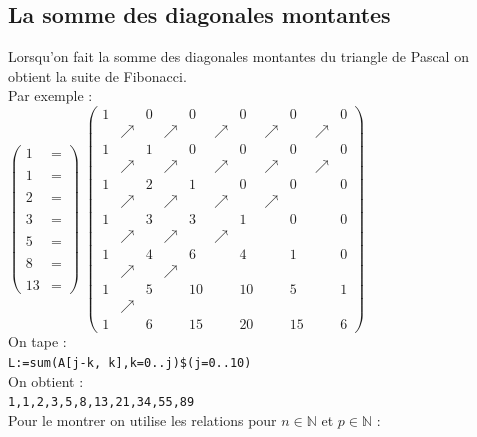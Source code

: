 \documentclass[a4paper,11pt]{book}
\newcommand{\N}{{\mathbb{N}}}
\begin{document}
\subsection{La somme des diagonales montantes}
Lorsqu'on fait la somme des diagonales montantes du triangle de Pascal on obtient la suite de Fibonacci.\\
Par exemple :\\
$\left(\begin{array}{cc}
1&=\\
&\\
1&=\\
&\\
2&=\\
&\\
3&=\\
&\\
5&=\\
&\\
8&=\\
&\\
13&=
\end{array}\right) $
$\left(\begin{array}{ccccccccccc}
1 & & 0 & &0 & &0 & &0 & &0 \\
 &\nearrow & &\nearrow &  &\nearrow &  & \nearrow &  &\nearrow  \\
1 & & 1 & &0 & &0 & &0 & &0 \\
 &\nearrow & &\nearrow &  &\nearrow &  & \nearrow &  &\nearrow  \\
1 & &2 & & 1 & &0 & &0 & &0 \\
&\nearrow & &\nearrow & &\nearrow &  &\nearrow  &  &  \\
1 & &3 & &3 & &1 & &0 & &0 \\
&\nearrow & &\nearrow & &\nearrow &  &  &  &  \\
1 & &4 & &6 & &4 & &1 & &0  \\
&\nearrow & &\nearrow & &&  & &  & \\
1 & &5 & &10 & &10 & &5 & &1 \\ 
&\nearrow & & & &&  & &  &  \\
1 & &6 & &15 & &20 & &15 & &6  
\end{array}\right) $\\
On tape :\\
{\tt L:=sum(A[j-k, k],k=0..j)\$(j=0..10)}\\
On obtient :\\
{\tt 1,1,2,3,5,8,13,21,34,55,89}\\
Pour le montrer on utilise les relations pour $n \in \N$ et $p \in \N$ :\\
\end{document}
